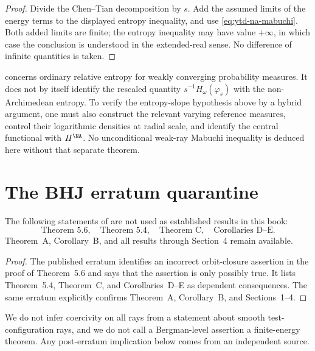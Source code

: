 \begin{proof}
Divide the Chen--Tian decomposition by $s$. Add the assumed limits of
the energy terms to the displayed entropy inequality, and use
\eqref{eq:ytd-na-mabuchi}. Both added limits are finite; the entropy
inequality may have value $+\infty$, in which case the conclusion is
understood in the extended-real sense. No difference of infinite quantities
is taken.
\end{proof}

\begin{remark}
\label{rem:ytd-entropy-slope-firewall}
 concerns ordinary relative
entropy for weakly converging probability measures. It does not by
itself identify the rescaled quantity $s^{-1}H_\omega(\varphi_s)$
with the non-Archimedean entropy. To verify the entropy-slope hypothesis
above by a hybrid argument, one must also construct the relevant varying
reference measures, control their
logarithmic densities at radial scale, and identify the central
functional with $H^{\NA}$. No unconditional weak-ray Mabuchi
inequality is deduced here without that separate theorem.
\end{remark}

\section{The BHJ erratum quarantine}
\label{sec:ytd-erratum}

\begin{theorem}\label{thm:ytd-erratum-quarantine}
The following statements of \cite{BHJ19} are not used as established
results in this book:
\[
 \text{Theorem~5.6},\quad
 \text{Theorem~5.4},\quad
 \text{Theorem~C},\quad
 \text{Corollaries~D--E}.
\tag{68.15}\label{eq:ytd-quarantined-results}
\]
Theorem~A, Corollary~B, and all results through Section~4 remain
available.
\end{theorem}

\begin{proof}
The published erratum \cite{BHJ19err} identifies an incorrect
orbit-closure assertion in the proof of Theorem~5.6 and says that the
assertion is only possibly true. It lists Theorem~5.4, Theorem~C, and
Corollaries~D--E as dependent consequences. The same erratum explicitly
confirms Theorem~A, Corollary~B, and Sections~1--4.
\end{proof}

\begin{remark}
\label{rem:ytd-no-laundering}
We do not infer coercivity on all rays from a statement about smooth
test-configuration rays, and we do not call a Bergman-level assertion
a finite-energy theorem. Any post-erratum implication below comes from
an independent source.
\end{remark}

